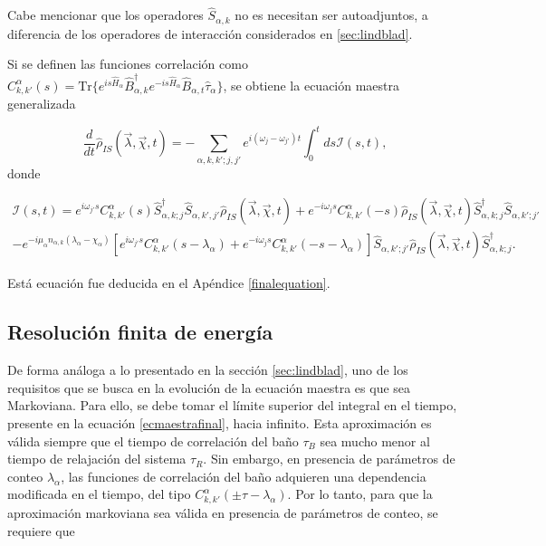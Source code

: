 Cabe mencionar que los operadores $\hat{S}_{\alpha,k}$ no es necesitan ser autoadjuntos, a diferencia de los  operadores de interacción considerados en \ref{sec:lindblad}.

Si se definen las funciones correlación como $C^{\alpha}_{k,k'}(s) = \text{Tr}\{e^{is\hat{H}_{\alpha} }\hat{B}^{\dagger}_{\alpha,k}e^{-is\hat{H}_{\alpha} }\hat{B}_{\alpha,t}\hat{\tau}_{\alpha}\}$, se obtiene la ecuación maestra generalizada

\begin{equation}
    \frac{d}{dt}\hat{\rho}_{IS}(\vec{\lambda},\vec{\chi},t) = - \sum_{\alpha,k,k';j,j'}e^{i(\omega_{j}-\omega_{j'})t}\int_{0}^{t}ds \mathcal{I}(s,t) ,
\label{ecmaestrafinal}
\end{equation}
donde

\begin{multline*}
    \mathcal{I}(s,t) = e^{i\omega_{j'}s} C^{\alpha}_{k,k'}(s)\hat{S}^{\dagger}_{\alpha,k;j}\hat{S}_{\alpha,k',j'}\hat{\rho}_{IS}(\vec{\lambda},\vec{\chi},t) + e^{-i\omega_{j}s}C^{\alpha}_{k,k'}(-s)\hat{\rho}_{IS}(\vec{\lambda},\vec{\chi},t)\hat{S}^{\dagger}_{\alpha,k;j}\hat{S}_{\alpha,k';j'} \\
    - e^{-i\mu_{\alpha}n_{\alpha,k}(\lambda_{\alpha} - \chi_{\alpha})}\left[e^{i\omega_{j'}s}C^{\alpha}_{k,k'}(s-\lambda_{\alpha}) + e^{-i\omega_{j}s}C^{\alpha}_{k,k'}(-s-\lambda_{\alpha})  \right]  \hat{S}_{\alpha,k';j'}\hat{\rho}_{IS}(\vec{\lambda},\vec{\chi},t)\hat{S}^{\dagger}_{\alpha,k;j}.
\end{multline*}

Está ecuación fue deducida en el Apéndice \ref{finalequation}.

\label{sec2:master}

\subsection{Resolución finita de energía}
De forma análoga a lo presentado en la sección \ref{sec:lindblad}, uno de los requisitos que se busca en la evolución de la ecuación maestra es que sea Markoviana. Para ello, se debe tomar el límite superior del integral en el tiempo, presente en la ecuación \ref{ecmaestrafinal}, hacia infinito. Esta aproximación es válida siempre que el tiempo de correlación del baño $\tau_{B}$ sea mucho menor al tiempo de relajación del sistema $\tau_{R}$. Sin embargo, en presencia de parámetros de conteo $\lambda_{\alpha}$, las funciones de correlación del baño adquieren una dependencia modificada en el tiempo, del tipo $C^{\alpha}_{k,k'}(\pm \tau - \lambda_\alpha)$. Por lo tanto, para que la aproximación markoviana sea válida en presencia de parámetros de conteo, se requiere que 

